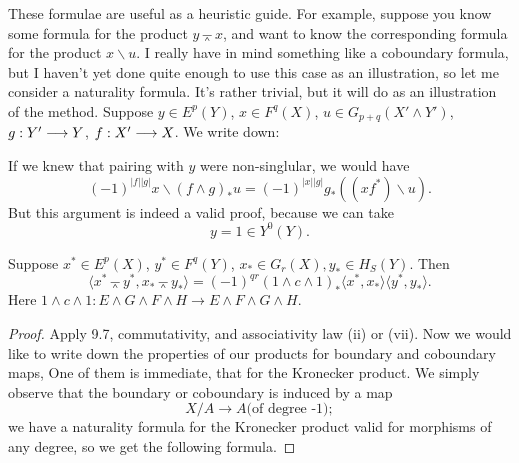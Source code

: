 \documentclass[../main]{subfiles}
\begin{document}
These formulae are useful as a heuristic guide. For example, suppose you know some formula for the product $y \barwedge x$, and want to know the corresponding formula for the product $x \backslash u$. I really have in mind something like a coboundary formula, but I haven't yet done quite enough to use this case as an illustration, so let me consider a naturality formula. It's rather trivial, but it will do as an illustration of the method. Suppose $y \in E^p(Y)$, $x \in F^q(X)$, $u \in G_{p + q}(X' \wedge Y')$, $g : Y' \overset{}{\longrightarrow} Y$, $f : X' \overset{}{\longrightarrow} X$. We write down:
\begin{center}
\end{center}
If we knew that pairing with $y$ were non-singlular, we would have $$(-1)^{|f||g|}x\backslash(f\wedge g)_\ast u=(-1)^{|x||g|}g_\ast((xf^\ast)\backslash u).$$ But this argument is indeed a valid proof, because we can take $$y=1 \in Y^0(Y).$$
\begin{proposition}\label{prop:p3ch09.8}
    Suppose $x^\ast \in E^p(X)$, $y^\ast \in F^q(Y)$, $x_\ast \in G_r(X), y_\ast \in H_S(Y)$. Then $$\langle x^\ast \barwedge y^\ast, x_\ast \barwedge y_\ast\rangle = (-1)^{qr}(1 \wedge c \wedge 1)_\ast \langle x^\ast,x_\ast\rangle\langle y^\ast,y_\ast\rangle .$$ Here $1 \wedge c \wedge 1: E \wedge G \wedge F \wedge H \longrightarrow E \wedge F \wedge G \wedge H. $
\end{proposition}

\begin{proof}
Apply 9.7, commutativity, and associativity law (ii) or (vii). Now we would like to write down the properties of our products for boundary and coboundary maps, One of them is immediate, that for the Kronecker product. We simply observe that the boundary or coboundary is induced by a map $$ X/A \longrightarrow A \text{(of degree -1)};$$ we have a naturality formula for the Kronecker product valid for morphisms of any degree, so we get the following formula.
\end{proof}
\end{document}
